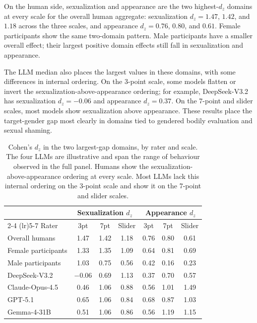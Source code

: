 \documentclass[a4paper,fleqn,review,longmktitle]{cas-sc}
\begin{document}
On the human side, sexualization and appearance are the two highest-$d_z$ domains at every scale for the overall human aggregate: sexualization $d_z = 1.47$, $1.42$, and $1.18$ across the three scales, and appearance $d_z = 0.76$, $0.80$, and $0.61$. Female participants show the same two-domain pattern. Male participants have a smaller overall effect; their largest positive domain effects still fall in sexualization and appearance.

The LLM median also places the largest values in these domains, with some differences in internal ordering. On the 3-point scale, some models flatten or invert the sexualization-above-appearance ordering; for example, DeepSeek-V3.2 has sexualization $d_z = -0.06$ and appearance $d_z = 0.37$. On the 7-point and slider scales, most models show sexualization above appearance. These results place the target-gender gap most clearly in domains tied to gendered bodily evaluation and sexual shaming.

\begin{table}[t]
  \small
  \centering
  \begin{tabular}{lccc ccc}
    \toprule
    & \multicolumn{3}{c}{Sexualization $d_z$} & \multicolumn{3}{c}{Appearance $d_z$} \\
    \cmidrule(lr){2-4} \cmidrule(lr){5-7}
    Rater & 3pt & 7pt & Slider & 3pt & 7pt & Slider \\
    \midrule
    Overall humans       & 1.47 & 1.42 & 1.18 & 0.76 & 0.80 & 0.61 \\
    Female participants  & 1.33 & 1.35 & 1.09 & 0.64 & 0.81 & 0.69 \\
    Male participants    & 1.03 & 0.75 & 0.56 & 0.42 & 0.16 & 0.23 \\
    \midrule
    DeepSeek-V3.2        & $-$0.06 & 0.69 & 1.13 & 0.37 & 0.70 & 0.57 \\
    Claude-Opus-4.5      & 0.46 & 1.06 & 0.88 & 0.56 & 1.01 & 1.49 \\
    GPT-5.1              & 0.65 & 1.06 & 0.84 & 0.68 & 0.87 & 1.03 \\
    Gemma-4-31B          & 0.51 & 1.06 & 0.86 & 0.56 & 1.19 & 1.15 \\
    \bottomrule
  \end{tabular}
  \caption{Cohen's $d_z$ in the two largest-gap domains, by rater and scale. The four LLMs are illustrative and span the range of behaviour observed in the full panel. Humans show the sexualization-above-appearance ordering at every scale. Most LLMs lack this internal ordering on the 3-point scale and show it on the 7-point and slider scales.}
  \label{tab:hotzone}
\end{table}
\end{document}
